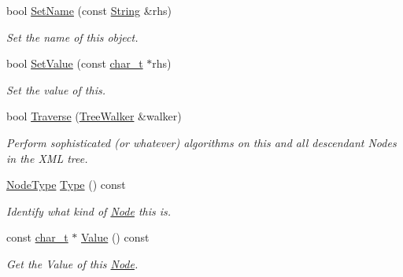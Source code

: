 \begin{DoxyCompactItemize}
bool \hyperlink{classMezzanine_1_1xml_1_1Node_a606efad0e6f880cbb6b447005b2e24e0}{SetName} (const \hyperlink{namespaceMezzanine_1_1xml_a3ddf35656ecc38b6fa1d0364d9ad3b2c}{String} \&rhs)
\begin{DoxyCompactList}\small\item\em Set the name of this object. \item\end{DoxyCompactList}\item 
bool \hyperlink{classMezzanine_1_1xml_1_1Node_a86ca6281c21ba29a3e1476ac7cd5a48f}{SetValue} (const \hyperlink{namespaceMezzanine_1_1xml_a29b8a47c179e9895c4e9e66c45d1dbbc}{char\_\-t} $\ast$rhs)
\begin{DoxyCompactList}\small\item\em Set the value of this. \item\end{DoxyCompactList}\item 
bool \hyperlink{classMezzanine_1_1xml_1_1Node_a3115c4b78afaa9b27a54c1d4200dbcc7}{Traverse} (\hyperlink{classMezzanine_1_1xml_1_1TreeWalker}{TreeWalker} \&walker)
\begin{DoxyCompactList}\small\item\em Perform sophisticated (or whatever) algorithms on this and all descendant Nodes in the XML tree. \item\end{DoxyCompactList}\item 
\hyperlink{namespaceMezzanine_1_1xml_a524d867e34ff408b8f45a51b7924cb80}{NodeType} \hyperlink{classMezzanine_1_1xml_1_1Node_a939a7a98e48ca8abb3349909586dd081}{Type} () const 
\begin{DoxyCompactList}\small\item\em Identify what kind of \hyperlink{classMezzanine_1_1xml_1_1Node}{Node} this is. \item\end{DoxyCompactList}\item 
const \hyperlink{namespaceMezzanine_1_1xml_a29b8a47c179e9895c4e9e66c45d1dbbc}{char\_\-t} $\ast$ \hyperlink{classMezzanine_1_1xml_1_1Node_a8fb0f29e78a3641ef14e3d71ac73144b}{Value} () const 
\begin{DoxyCompactList}\small\item\em Get the Value of this \hyperlink{classMezzanine_1_1xml_1_1Node}{Node}. \item\end{DoxyCompactList}\end{DoxyCompactItemize}
